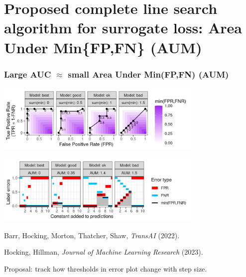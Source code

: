 \documentclass[t]{beamer}
\begin{document}
\section{Proposed complete line search algorithm for surrogate loss: Area Under Min\{FP,FN\} (AUM)} 

\begin{frame}
  \frametitle{Large AUC $\approx$ small Area Under Min(FP,FN) (AUM)} 
  
  \includegraphics[height=1.3in]{figure-more-than-one-binary-heat}

  \includegraphics[height=1.3in]{figure-more-than-one-binary-aum-rate}

  Barr, Hocking, Morton, Thatcher, Shaw, \emph{TransAI} (2022).

  Hocking, Hillman, \emph{Journal of Machine Learning Research} (2023).

  Proposal: track how thresholds in error plot change with step size.
  
\end{frame}
\end{document}
